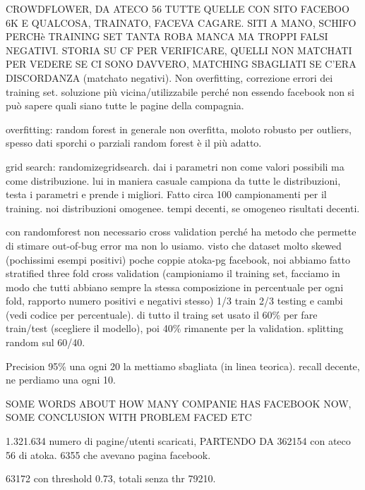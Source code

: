 CROWDFLOWER, DA ATECO 56 TUTTE QUELLE CON SITO FACEBOO 6K E QUALCOSA, TRAINATO, FACEVA CAGARE. SITI A MANO, SCHIFO PERCHè TRAINING SET TANTA ROBA MANCA MA TROPPI FALSI NEGATIVI. STORIA SU CF PER VERIFICARE, QUELLI NON MATCHATI PER VEDERE SE CI SONO DAVVERO, MATCHING SBAGLIATI SE C'ERA DISCORDANZA (matchato negativi). Non overfitting, correzione errori dei training set. soluzione più vicina/utilizzabile perché non essendo facebook non si può sapere quali siano tutte le pagine della compagnia.


overfitting: random forest in generale non overfitta, moloto robusto per outliers, spesso dati sporchi o parziali random forest è il più adatto.

grid search: randomizegridsearch. dai i parametri non come valori possibili ma come distribuzione. lui in maniera casuale campiona da tutte le distribuzioni, testa i parametri e prende i migliori. Fatto circa 100 campionamenti per il training. noi distribuzioni omogenee. tempi decenti, se omogeneo risultati decenti.

con randomforest non necessario cross validation perché ha metodo che permette di stimare out-of-bug error ma non lo usiamo. visto che dataset molto skewed (pochissimi esempi positivi) poche coppie atoka-pg facebook, noi abbiamo fatto stratified three fold cross validation (campioniamo il training set, facciamo in modo che tutti abbiano sempre la stessa composizione in percentuale per ogni fold, rapporto numero positivi e negativi stesso) 1/3 train 2/3 testing e cambi (vedi codice per percentuale). di tutto il traing set usato il 60\% per fare train/test (scegliere il modello), poi 40\% rimanente per la validation. splitting random sul 60/40.

Precision 95\% una ogni 20 la mettiamo sbagliata (in linea teorica). recall decente, ne perdiamo una ogni 10.


SOME WORDS ABOUT HOW MANY COMPANIE HAS FACEBOOK NOW, SOME CONCLUSION WITH PROBLEM FACED ETC


1.321.634 numero di pagine/utenti scaricati, PARTENDO DA 362154 con ateco 56 di atoka. 6355 che avevano pagina facebook.

63172 con threshold 0.73, totali senza thr 79210. 